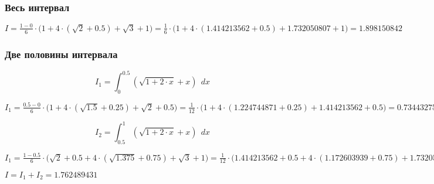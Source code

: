 \subsubsection{Весь интервал}

$I = \frac{1 - 0}{6} \cdot \Big ( 1 + 4 \cdot (\sqrt{2} + 0.5) + \sqrt{3} + 1 \Big ) = \frac{1}{6} \cdot \Big ( 1 + 4 \cdot (1.414213562 + 0.5) + 1.732050807 + 1 \Big ) = 1.898150842$

\subsubsection{Две половины интервала}

\begin{displaymath}
I_1 = \int_{0}^{0.5} (\sqrt{1 + 2 \cdot x} + x)\ \ dx
\end{displaymath}

$I_1 = \frac{0.5 - 0}{6} \cdot \Big ( 1 + 4 \cdot (\sqrt{1.5} + 0.25) + \sqrt{2} + 0.5 \Big ) = \frac{1}{12} \cdot \Big ( 1 + 4 \cdot (1.224744871 + 0.25) + 1.414213562 + 0.5 \Big ) = 0.734432754$

\begin{displaymath}
I_2 = \int_{0.5}^{1} (\sqrt{1 + 2 \cdot x} + x)\ \ dx
\end{displaymath}

$I_1 = \frac{1 - 0.5}{6} \cdot \Big ( \sqrt{2} + 0.5 +  4 \cdot (\sqrt{1.375} + 0.75) + \sqrt{3} + 1 \Big ) = \frac{1}{12} \cdot \Big ( 1.414213562 + 0.5 +  4 \cdot (1.172603939 + 0.75) + 1.732050807 + 1 \Big ) = 1.028056677$

$I = I_1 + I_2 = 1.762489431$


